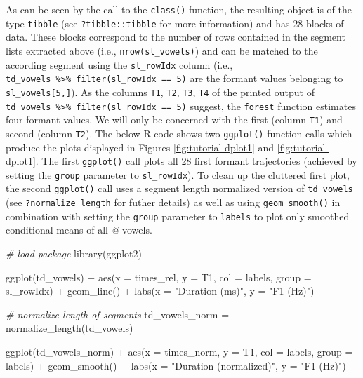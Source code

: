 \documentclass[
]{book}
\newenvironment{Shaded}{\begin{snugshade}}{\end{snugshade}}
\newcommand{\AttributeTok}[1]{\textcolor[rgb]{0.77,0.63,0.00}{#1}}
\newcommand{\CommentTok}[1]{\textcolor[rgb]{0.56,0.35,0.01}{\textit{#1}}}
\newcommand{\FunctionTok}[1]{\textcolor[rgb]{0.00,0.00,0.00}{#1}}
\newcommand{\NormalTok}[1]{#1}
\newcommand{\OtherTok}[1]{\textcolor[rgb]{0.56,0.35,0.01}{#1}}
\newcommand{\SpecialCharTok}[1]{\textcolor[rgb]{0.00,0.00,0.00}{#1}}
\newcommand{\StringTok}[1]{\textcolor[rgb]{0.31,0.60,0.02}{#1}}
\begin{document}
As can be seen by the call to the \texttt{class()} function, the resulting object is of the type \texttt{tibble} (see \texttt{?tibble::tibble} for more information) and has 28 blocks of data. These blocks correspond to the number of rows contained in the segment lists extracted above (i.e., \texttt{nrow(sl\_vowels)}) and can be matched to the according segment using the \texttt{sl\_rowIdx} column (i.e., \texttt{td\_vowels\ \%\textgreater{}\%\ filter(sl\_rowIdx\ ==\ 5)} are the formant values belonging to \texttt{sl\_vowels{[}5,{]}}). As the columns \texttt{T1}, \texttt{T2}, \texttt{T3}, \texttt{T4} of the printed output of \texttt{td\_vowels\ \%\textgreater{}\%\ filter(sl\_rowIdx\ ==\ 5)} suggest, the \texttt{forest} function estimates four formant values. We will only be concerned with the first (column \texttt{T1}) and second (column \texttt{T2}). The below R code shows two \texttt{ggplot()} function calls which produce the plots displayed in Figures \ref{fig:tutorial-dplot1} and \ref{fig:tutorial-dplot1}. The first \texttt{ggplot()} call plots all 28 first formant trajectories (achieved by setting the \texttt{group} parameter to \texttt{sl\_rowIdx}). To clean up the cluttered first plot, the second \texttt{ggplot()} call uses a segment length normalized version of \texttt{td\_vowels} (see \texttt{?normalize\_length} for futher details) as well as using \texttt{geom\_smooth()} in combination with setting the \texttt{group} parameter to \texttt{labels} to plot only smoothed conditional means of all \emph{@} vowels.

\begin{Shaded}
\begin{Highlighting}[]
\CommentTok{\# load package}
\FunctionTok{library}\NormalTok{(ggplot2)}

\FunctionTok{ggplot}\NormalTok{(td\_vowels) }\SpecialCharTok{+}
  \FunctionTok{aes}\NormalTok{(}\AttributeTok{x =}\NormalTok{ times\_rel, }\AttributeTok{y =}\NormalTok{ T1, }\AttributeTok{col =}\NormalTok{ labels, }\AttributeTok{group =}\NormalTok{ sl\_rowIdx) }\SpecialCharTok{+}
  \FunctionTok{geom\_line}\NormalTok{() }\SpecialCharTok{+}
  \FunctionTok{labs}\NormalTok{(}\AttributeTok{x =} \StringTok{"Duration (ms)"}\NormalTok{, }\AttributeTok{y =} \StringTok{"F1 (Hz)"}\NormalTok{)}

\CommentTok{\# normalize length of segments}
\NormalTok{td\_vowels\_norm }\OtherTok{=} \FunctionTok{normalize\_length}\NormalTok{(td\_vowels)}

\FunctionTok{ggplot}\NormalTok{(td\_vowels\_norm) }\SpecialCharTok{+}
  \FunctionTok{aes}\NormalTok{(}\AttributeTok{x =}\NormalTok{ times\_norm, }\AttributeTok{y =}\NormalTok{ T1, }\AttributeTok{col =}\NormalTok{ labels, }\AttributeTok{group =}\NormalTok{ labels) }\SpecialCharTok{+}
  \FunctionTok{geom\_smooth}\NormalTok{() }\SpecialCharTok{+}
  \FunctionTok{labs}\NormalTok{(}\AttributeTok{x =} \StringTok{"Duration (normalized)"}\NormalTok{, }\AttributeTok{y =} \StringTok{"F1 (Hz)"}\NormalTok{) }
\end{Highlighting}
\end{Shaded}
\end{document}
